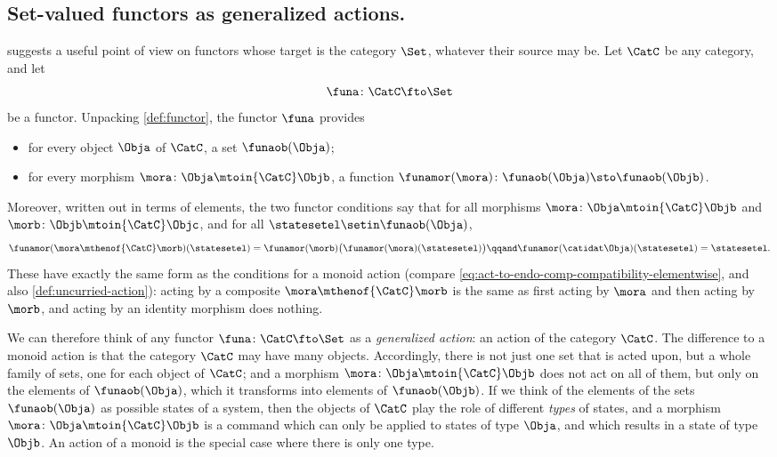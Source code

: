 \subsection{Set-valued functors as generalized actions.}
 suggests a useful point of view on functors whose target is the category $\Set$, whatever their source may be.
Let $\CatC$ be any category, and let
\begin{equation}
    \funa \colon \CatC \fto \Set
\end{equation}
be a functor.
Unpacking \cref{def:functor}, the functor $\funa$ provides
\begin{itemize}
    \item for every object $\Obja$ of $\CatC$, a set $\funaob(\Obja)$;
    \item for every morphism $\mora \colon \Obja \mtoin{\CatC} \Objb$, a function $\funamor(\mora) \colon \funaob(\Obja) \sto \funaob(\Objb)$.
\end{itemize}
Moreover, written out in terms of elements, the two functor conditions say that for all morphisms $\mora \colon \Obja \mtoin{\CatC} \Objb$ and $\morb \colon \Objb \mtoin{\CatC} \Objc$, and for all $\statesetel \setin \funaob(\Obja)$,
\begin{equation}
    \label{eq:generalized-action-conditions}
    \funamor(\mora \mthenof{\CatC} \morb)(\statesetel) = \funamor(\morb)\bigl(\funamor(\mora)(\statesetel)\bigr)
    \qqand
    \funamor(\catidat\Obja)(\statesetel) = \statesetel.
\end{equation}
These have exactly the same form as the conditions for a monoid action (compare \cref{eq:act-to-endo-comp-compatibility-elementwise}, and also \cref{def:uncurried-action}): acting by a composite $\mora \mthenof{\CatC} \morb$ is the same as first acting by $\mora$ and then acting by $\morb$, and acting by an identity morphism does nothing.

We can therefore think of any functor $\funa \colon \CatC \fto \Set$ as a \emph{generalized action}: an action of the category $\CatC$.
The difference to a monoid action is that the category $\CatC$ may have many objects.
Accordingly, there is not just one set that is acted upon, but a whole family of sets, one for each object of $\CatC$; and a morphism $\mora \colon \Obja \mtoin{\CatC} \Objb$ does not act on all of them, but only on the elements of $\funaob(\Obja)$, which it transforms into elements of $\funaob(\Objb)$.
If we think of the elements of the sets $\funaob(\Obja)$ as possible states of a system, then the objects of $\CatC$ play the role of different \emph{types} of states, and a morphism $\mora \colon \Obja \mtoin{\CatC} \Objb$ is a command which can only be applied to states of type $\Obja$, and which results in a state of type $\Objb$.
An action of a monoid is the special case where there is only one type.

